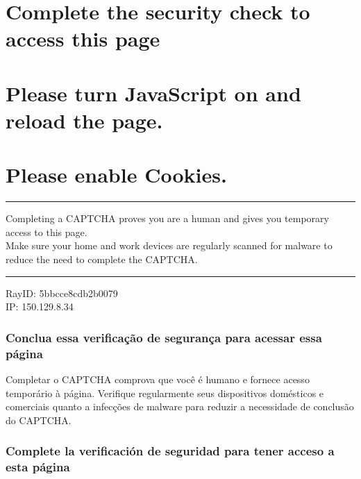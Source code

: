 \hypertarget{complete-the-security-check-to-access-this-page}{%
\section{Complete the security check to access this
page}\label{complete-the-security-check-to-access-this-page}}

\hypertarget{please-turn-javascript-on-and-reload-the-page}{%
\section{Please turn JavaScript on and reload the
page.}\label{please-turn-javascript-on-and-reload-the-page}}

\hypertarget{please-enable-cookies}{%
\section{Please enable Cookies.}\label{please-enable-cookies}}

\begin{center}\rule{0.5\linewidth}{\linethickness}\end{center}

Completing a CAPTCHA proves you are a human and gives you temporary
access to this page.\\
Make sure your home and work devices are regularly scanned for malware
to reduce the need to complete the CAPTCHA.

\begin{center}\rule{0.5\linewidth}{\linethickness}\end{center}

RayID: 5bbcce8cdb2b0079\\
IP: 150.129.8.34

\hypertarget{conclua-essa-verificauxe7uxe3o-de-seguranuxe7a-para-acessar-essa-puxe1gina}{%
\subsubsection{Conclua essa verificação de segurança para acessar essa
página}\label{conclua-essa-verificauxe7uxe3o-de-seguranuxe7a-para-acessar-essa-puxe1gina}}

Completar o CAPTCHA comprova que você é humano e fornece acesso
temporário à página. Verifique regularmente seus dispositivos domésticos
e comerciais quanto a infecções de malware para reduzir a necessidade de
conclusão do CAPTCHA.

\hypertarget{complete-la-verificaciuxf3n-de-seguridad-para-tener-acceso-a-esta-puxe1gina}{%
\subsubsection{Complete la verificación de seguridad para tener acceso a
esta
página}\label{complete-la-verificaciuxf3n-de-seguridad-para-tener-acceso-a-esta-puxe1gina}}

